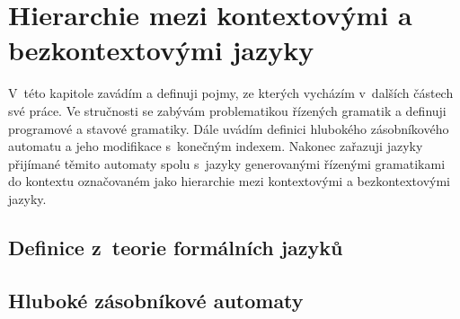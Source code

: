 

\chapter{Hierarchie mezi kontextovými a bezkontextovými jazyky}

V~této kapitole zavádím a definuji pojmy, ze kterých vycházím v~dalších částech své práce. Ve stručnosti se zabývám problematikou řízených gramatik a definuji programové a stavové gramatiky. Dále uvádím definici hlubokého zásobníkového automatu a jeho modifikace s~konečným indexem. Nakonec zařazuji jazyky přijímané těmito automaty spolu s~jazyky generovanými řízenými gramatikami do kontextu označovaném jako hierarchie mezi kontextovými a bezkontextovými jazyky.

\section{Definice z~teorie formálních jazyků}


\section{Hluboké zásobníkové automaty}


